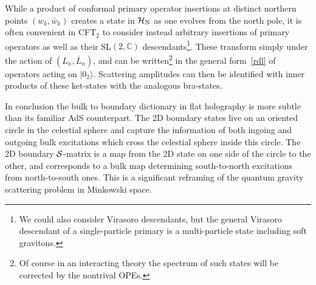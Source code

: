 \documentclass[11pt]{article}
\def\ch{\cal{H}}
\numberwithin{equation}{section}
\begin{document}
While a product of conformal primary operator insertions at distinct northern points $(w_k,\bar w_k)$ creates a state in $\ch_{\rm N}$ as one evolves from the north pole, it is often convenient in CFT$_2$ to consider instead arbitrary insertions of primary operators as well as their SL$(2,\mathbb{C})$ descendants\footnote{We could also consider Virasoro descendants, but the general Virasoro descendant of a single-particle primary is a multi-particle state including soft gravitons.}. These transform simply under the action of $(L_n, \bar L_n)$, and can be written\footnote{Of course in an interacting theory  the spectrum of such states will be corrected by the nontrival OPEs.} in the general form~\eqref{rdl} of operators acting on $|0_2\rangle$. Scattering amplitudes can then be identified with inner products of these ket-states with the analogous bra-states.

In conclusion the bulk to boundary dictionary in flat holography is more subtle than its familiar AdS counterpart. The 2D boundary states live on an oriented  circle in the celestial sphere and capture the information of both ingoing  and outgoing bulk  excitations which cross the celestial sphere inside this circle. The 2D boundary $\cal S$-matrix is a map from the 2D state on one side of the circle to the other, and corresponds to a bulk map determining south-to-north excitations from north-to-south ones. This is a significant reframing of the quantum gravity scattering problem in Minkowski space. 
\end{document}
